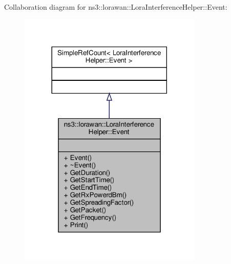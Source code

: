 Collaboration diagram for ns3\+:\+:lorawan\+:\+:Lora\+Interference\+Helper\+:\+:Event\+:
\nopagebreak
\begin{figure}[H]
\begin{center}
\leavevmode
\includegraphics[width=248pt]{classns3_1_1lorawan_1_1LoraInterferenceHelper_1_1Event__coll__graph}
\end{center}
\end{figure}

